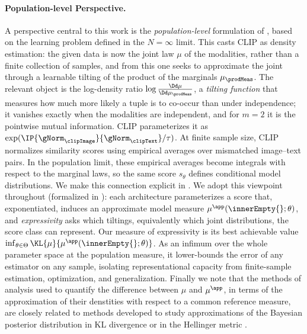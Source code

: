 \documentclass{article}
\begin{document}
\paragraph{Population-level Perspective.}
A perspective central to this work is the \emph{population-level}
formulation of \citet{baptistaMathematicalPerspectiveContrastive2025},
based on the learning problem defined in the $N=\infty$ limit. This casts
CLIP as density estimation: the given data is now the joint law $\mu$ of
the modalities, rather than a finite collection of samples, and from this
one seeks to approximate the joint through a learnable tilting of the
product of the marginals $\mu_\prodMeas$. The relevant object is the
log-density ratio $\log\frac{\Dd\mu}{\Dd\mu_\prodMeas}$, a \emph{tilting
 function} that measures how much more likely a tuple is to co-occur than
under independence; it vanishes exactly when the modalities are
independent, and for $m=2$ it is the pointwise mutual information. CLIP
parameterizes it as $\exp(\IP{\gNorm_\clipImage}{\gNorm_\clipText}/\tau)$.
At finite sample size, CLIP normalizes similarity scores using empirical
averages over mismatched image--text pairs. In the population limit, these
empirical averages become integrals with respect to the marginal laws, so
the same score \(s_\theta\) defines conditional model distributions. We
make this connection explicit in . We adopt this viewpoint
throughout (formalized in ): each architecture
parameterizes a score that, exponentiated, induces an approximate model
measure $\mu^{\app}(\innerEmpty{};\theta)$, and \emph{expressivity} asks
which tiltings, equivalently which joint distributions, the score class can
represent. Our measure of expressivity is its best achievable value
$\inf_{\theta\in\Theta} \KL{\mu}{\mu^{\app}(\innerEmpty{};\theta)}$. As an
infimum over the whole parameter space at the population measure, it
lower-bounds the error of any estimator on any sample, isolating
representational capacity from finite-sample estimation, optimization, and
generalization. Finally we note that the methods of analysis used to
quantify the difference between $\mu$ and $\mu^{\app}$, in terms of the
approximation of their denstities with respect to a common reference
measure, are closely related to methods developed to study approximations
of the Bayesian posterior distribution in KL divergence or in the Hellinger
metric \citep{marzouk2009stochastic,stuart2010inverse}.
\end{document}
